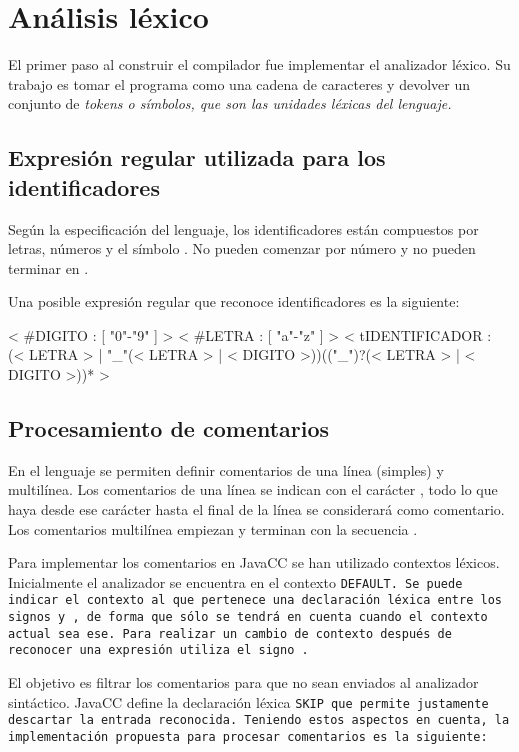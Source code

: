 \section{Análisis léxico}
El primer paso al construir el compilador fue implementar el analizador léxico. Su trabajo es tomar el programa como una cadena de caracteres y devolver un conjunto de \it{tokens} o símbolos, que son las unidades léxicas del lenguaje.

\subsection{Expresión regular utilizada para los identificadores}
Según la especificación del lenguaje, los identificadores están compuestos por letras, números y el símbolo \car{\_}. No pueden comenzar por número y no pueden terminar en \car{\_}.

Una posible expresión regular que reconoce identificadores es la siguiente:

\begin{codigo}
< #DIGITO : [ "0"-"9" ] >
< #LETRA : [ "a"-"z" ] >
< tIDENTIFICADOR :
  (< LETRA > | "_"(< LETRA > | < DIGITO >))(("_")?(< LETRA > | < DIGITO >))* >
\end{codigo}

\subsection{Procesamiento de comentarios}
En el lenguaje se permiten definir comentarios de una línea (simples) y multilínea.  Los comentarios de una línea se indican con el carácter \car{\%}, todo lo que haya desde ese carácter hasta el final de la línea se considerará como comentario. Los comentarios multilínea empiezan y terminan con la secuencia \car{\%\%}.

Para implementar los comentarios en JavaCC se han utilizado contextos léxicos.
Inicialmente el analizador se encuentra en el contexto \tt{DEFAULT}.
Se puede indicar el contexto al que pertenece una declaración léxica entre los signos \car{\textless} y \car{\textgreater}, de forma que sólo se tendrá en cuenta cuando el contexto actual sea ese. Para realizar un cambio de contexto después de reconocer una expresión utiliza el signo \car{:}.

El objetivo es filtrar los comentarios para que no sean enviados al analizador sintáctico. JavaCC define la declaración léxica \tt{SKIP} que permite justamente descartar la entrada reconocida. Teniendo estos aspectos en cuenta, la implementación propuesta para procesar comentarios es la siguiente:

